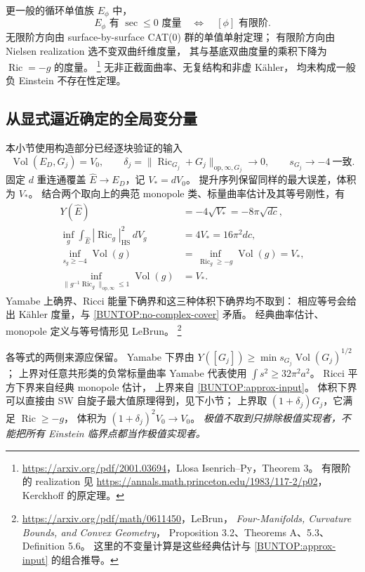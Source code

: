 \documentclass[UTF8,fontset=fandol,zihao=-4,oneside,openany]{ctexbook}
\theoremstyle{cjkplain}
\numberwithin{equation}{chapter}
\begin{document}
更一般的循环单值族 \(E_\phi\) 中，
\[
 E_\phi\text{ 有 }\sec\le0\text{ 度量}
 \quad\Longleftrightarrow\quad[\phi]\text{ 有限阶}.
\]
无限阶方向由 surface-by-surface CAT(0) 群的单值单射定理；
有限阶方向由 Nielsen realization 选不变双曲纤维度量，
其与基底双曲度量的乘积下降为 \(\operatorname{Ric}=-g\) 的度量。%
\footnote{\url{https://arxiv.org/pdf/2001.03694}，Llosa Isenrich--Py，Theorem 3。
有限阶的 realization 见
\url{https://annals.math.princeton.edu/1983/117-2/p02}，Kerckhoff 的原定理。}
无非正截面曲率、无复结构和非虚 K\"ahler，
均未构成一般负 Einstein 不存在性定理。

\subsection{从显式逼近确定的全局变分量}
\label{BUNTOP:global-values}

本小节使用构造部分已经逐块验证的输入
\begin{equation}
 \operatorname{Vol}(E_D,G_j)=V_0,\qquad
 \delta_j=\|\operatorname{Ric}_{G_j}+G_j\|_{\mathrm{op},\infty,G_j}\to0,
 \qquad s_{G_j}\to-4\ \text{一致}.
 \label{BUNTOP:approx-input}
\end{equation}
固定 \(d\) 重连通覆盖 \(\widehat E\to E_D\)，记 \(V_*=dV_0\)。
提升序列保留同样的最大误差，体积为 \(V_*\)。
结合两个取向上的典范 monopole 类、标量曲率估计及其等号刚性，有
\begin{align}
 Y(\widehat E)&=-4\sqrt{V_*}=-8\pi\sqrt{dc},\label{BUNTOP:Yamabe}\\
 \inf_g\int_{\widehat E}|\operatorname{Ric}_g|_{\mathrm{HS}}^2\,dV_g
 &=4V_*=16\pi^2dc,\label{BUNTOP:Ric-energy}\\
 \inf_{s_g\ge-4}\operatorname{Vol}(g)
 &=\inf_{\operatorname{Ric}_g\ge-g}\operatorname{Vol}(g)=V_*,
 \nonumber\\
 \inf_{\|g^{-1}\operatorname{Ric}_g\|_{\mathrm{op},\infty}\le1}
       \operatorname{Vol}(g)&=V_* .
 \label{BUNTOP:min-volume}
\end{align}
Yamabe 上确界、Ricci 能量下确界和这三种体积下确界均不取到：
相应等号会给出 K\"ahler 度量，与
\eqref{BUNTOP:no-complex-cover} 矛盾。
经典曲率估计、monopole 定义与等号情形见 LeBrun。%
\footnote{\url{https://arxiv.org/pdf/math/0611450}，LeBrun，
\emph{Four-Manifolds, Curvature Bounds, and Convex Geometry}，
Proposition 3.2、Theorems A、5.3、Definition 5.6。
这里的不变量计算是这些经典估计与
\eqref{BUNTOP:approx-input} 的组合推导。}

各等式的两侧来源应保留。
Yamabe 下界由
\(Y([G_j])\ge\min s_{G_j}\operatorname{Vol}(G_j)^{1/2}\)；
上界对任意共形类的负常标量曲率 Yamabe 代表使用
\(\int s^2\ge32\pi^2 a^2\)。
Ricci 平方下界来自经典 monopole 估计，
上界来自 \eqref{BUNTOP:approx-input}。
体积下界可以直接由 SW 自旋子最大值原理得到，见下小节；
上界取 \((1+\delta_j)G_j\)，它满足 \(\operatorname{Ric}\ge-g\)，
体积为 \((1+\delta_j)^2V_0\to V_0\)。
\emph{极值不取到只排除极值实现者，不能把所有 Einstein 临界点都当作极值实现者。}
\end{document}

